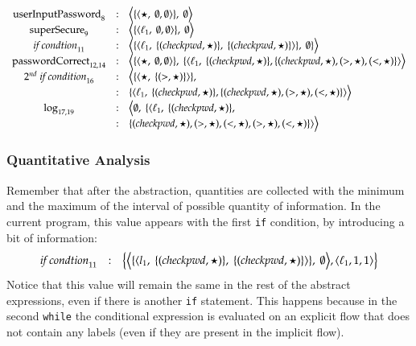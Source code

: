 \documentclass{llncs}
\newcommand{\blangle}{\big\langle}
\newcommand{\brangle}{\big\rangle}
\begin{document}
\begin{center}
{\footnotesize$
\begin{array}{ccl}
\mbox{userInputPassword}_{8} &:& \blangle\{\langle \star,\ \emptyset, \emptyset\rangle\},\ \emptyset\brangle\\
\mbox{superSecure}_{9} &:& \blangle\{\langle \ell_1,\ \emptyset,\emptyset\rangle\},\ \emptyset\brangle\\
\mbox{\textit{if condtion}}_{11} &:& \blangle\{\langle \ell_1,\ \{(checkpwd, \star)\},\ \{(checkpwd, \star)\}\rangle\},\ \emptyset\}\brangle\\
\mbox{passwordCorrect}_{12,14} &:& \blangle\{\langle \star,\ \emptyset,\emptyset\rangle\},\ \{\langle  \ell_1,\ \{(checkpwd, \star)\},\{(checkpwd, \star), (>, \star),(<, \star)\}\rangle\brangle\\
\mbox{\textit{$2^{nd}$ if condition}}_{16} &:& \blangle\{\langle \star,\ \{(>, \star)\}\rangle\},\\ 
&:& \{\langle  \ell_1,\ \{(checkpwd, \star)\},\{(checkpwd, \star), (>, \star),(<, \star)\}\rangle\brangle\\
\mbox{log}_{17,19} &:& \blangle\emptyset,\ \{\langle  \ell_1,\ \{(checkpwd, \star)\},\\
&:& \{(checkpwd, \star), (>, \star),(<, \star),(>, \star),(<, \star)\}\rangle\brangle\\
\end{array}
$}
\end{center}

\subsubsection{Quantitative Analysis} 
Remember that after the abstraction, quantities are collected with the minimum and the maximum of the interval of possible quantity of information. In the current program, this value appears with the first \texttt{if} condition, by introducing a bit of information:
\begin{align*}
\begin{array}{ccl}
\mbox{\textit{if condtion}}_{11} & : & \big \{ \blangle\{\langle l_1,\ \{(checkpwd, \star)\},\ \{(checkpwd, \star)\}\rangle\},\ \emptyset\brangle, \langle \ell_1, 1, 1 \rangle \big \}
\end{array}
\end{align*}
Notice that this value will remain the same in the rest of the abstract expressions, even if there is another \texttt{if} statement. This happens because in the second \texttt{while} the conditional expression is evaluated on an explicit flow that does not contain any labels (even if they are present in the implicit flow).
\end{document}

